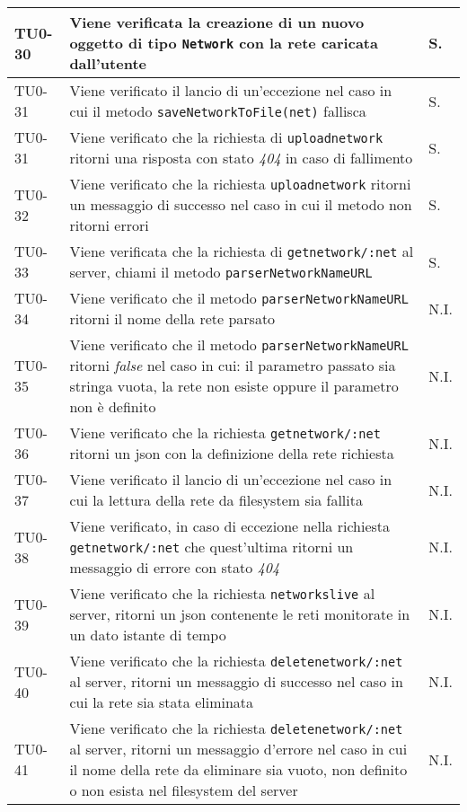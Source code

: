 \begin{longtable}{|C{.15\textwidth}|m{.65\textwidth}|C{.20\textwidth}|}
\hline 
TU0-30 & Viene verificata la creazione di un nuovo oggetto di tipo \texttt{Network} con la rete caricata dall'utente & S. \\ 
\hline
{} TU0-31 & Viene verificato il lancio di un'eccezione nel caso in cui il metodo \texttt{saveNetworkToFile(net)} fallisca & S. \\
\hline
TU0-31 & Viene verificato che la richiesta di \texttt{uploadnetwork} ritorni una risposta con stato \textit{404} in caso di fallimento & S. \\ 
\hline
{} TU0-32 & Viene verificato che la richiesta \texttt{uploadnetwork} ritorni un messaggio di successo nel caso in cui il metodo non ritorni errori & S. \\
\hline
TU0-33 & Viene verificata che la richiesta di \texttt{getnetwork/:net} al server, chiami il metodo \texttt{parserNetworkNameURL} & S. \\ 
\hline
{} TU0-34 & Viene verificato che il metodo \texttt{parserNetworkNameURL} ritorni il nome della rete parsato & N.I. \\ 
\hline 
TU0-35 & Viene verificato che il metodo \texttt{parserNetworkNameURL} ritorni \textit{false} nel caso in cui: il parametro passato sia stringa vuota, la rete non esiste oppure il parametro non è definito & N.I. \\ 
\hline 
{}TU0-36 & Viene verificato che la richiesta \texttt{getnetwork/:net} ritorni un json con la definizione della rete richiesta & N.I. \\ 
\hline 
TU0-37 & Viene verificato il lancio di un'eccezione nel caso in cui la lettura della rete da filesystem sia fallita & N.I. \\
\hline
  TU0-38 & Viene verificato, in caso di eccezione nella richiesta \texttt{getnetwork/:net} che quest'ultima ritorni un messaggio di errore con stato \textit{404} & N.I. \\ 
 \hline
 TU0-39 & Viene verificato che la richiesta \texttt{networkslive} al server, ritorni un json contenente le reti monitorate in un dato istante di tempo & N.I. \\ 
 \hline 
 TU0-40 & Viene verificato che la richiesta \texttt{deletenetwork/:net} al server, ritorni un messaggio di successo nel caso in cui la rete sia stata eliminata & N.I. \\
 \hline
 TU0-41 & Viene verificato che la richiesta \texttt{deletenetwork/:net} al server, ritorni un messaggio d'errore nel caso in cui il nome della rete da eliminare sia vuoto,  non definito o non esista nel filesystem del server & N.I. \\ 

\end{longtable}
